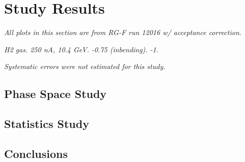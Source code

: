 \section{Study Results}
\begin{frame}{}
    \label{12.00::study_results}
    \centering \Huge{}

    \vspace{9pt}

    \small{\textit{
        All plots in this section are from RG-F run 12016 w/ acceptance correction.
    }}

    \small{\textit{
         H2 gas.
         250 nA, 10.4 GeV.
         -0.75 (inbending).
         -1.
    }}

    \small{\textit{
        Systematic errors were not estimated for this study.
    }}
\end{frame}

\subsection{Phase Space Study}


\subsection{Statistics Study}


\subsection{Conclusions}

